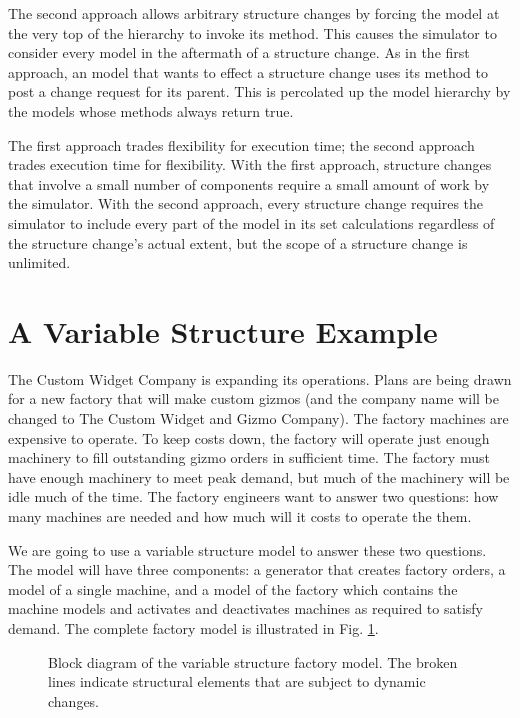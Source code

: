 The second approach allows arbitrary structure changes by forcing the model at the very top of the hierarchy to invoke its  method. This causes the simulator to consider every model in the aftermath of a structure change. As in the first approach, an  model that wants to effect a structure change uses its  method to post a change request for its parent. This is percolated up the model hierarchy by the  models whose  methods always return true. 

The first approach trades flexibility for execution time; the second approach trades execution time for flexibility. With the first approach, structure changes that involve a small number of components require a small amount of work by the simulator. With the second approach, every structure change requires the simulator to include every part of the model in its set calculations regardless of the structure change's actual extent, but the scope of a structure change is unlimited.

\section{A Variable Structure Example}
The Custom Widget Company is expanding its operations. Plans are being drawn for a new factory that will make custom gizmos (and the company name will be changed to The Custom Widget and Gizmo Company). The factory machines are expensive to operate. To keep costs down, the factory will operate just enough machinery to fill outstanding gizmo orders in sufficient time. The factory must have enough machinery to meet peak demand, but much of the machinery will be idle much of the time.
The factory engineers want to answer two questions: how many machines are needed and how much will it costs to operate the them. 

We are going to use a variable structure model to answer these two questions. The model will have three components: a generator that creates factory orders, a model of a single machine, and a model of the factory which contains the machine models and activates and deactivates machines as required to satisfy demand. The complete factory model is illustrated in Fig. \ref{fig:factory_model}.
\begin{figure}[ht]
\centering
{}
\caption{Block diagram of the variable structure factory model. The broken lines indicate structural elements that are subject to dynamic changes.}
\label{fig:factory_model}
\end{figure}

